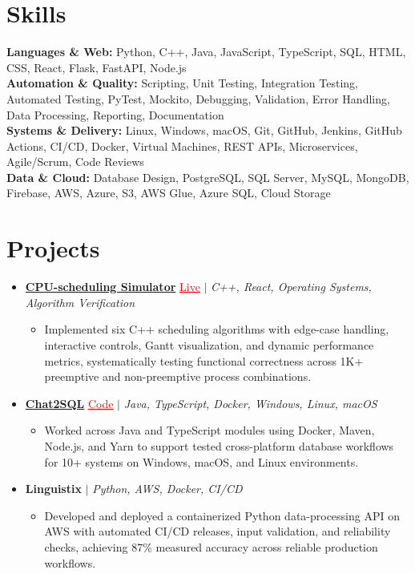 \documentclass[letterpaper,10pt]{article}
\newcommand{\itemTail}{\vspace{-4pt}}
\newcommand{\sectionGap}{\vspace{-8pt}}
\newcommand{\projGap}{\vspace{3pt}}
\newcommand{\resumeItem}[1]{\item\small{{#1 \itemTail}}}
\newcommand{\resumeProjectHeading}[1]{\item \small #1 \vspace{-2pt}}
\newcommand{\resumeProjectLink}[2]{\href{#1}{\textcolor{red}{\underline{#2}}}}
\newcommand{\resumeSubHeadingListStart}{\begin{itemize}[leftmargin=0.0in, label={}]}
\newcommand{\resumeSubHeadingListEnd}{\end{itemize}}
\newcommand{\resumeProjItemListStart}{\begin{itemize}[leftmargin=0.15in,label=\textbullet,itemsep=3pt,topsep=0pt,parsep=0pt,partopsep=0pt]}
\newcommand{\resumeProjItemListEnd}{\end{itemize}\vspace{-4pt}}
\begin{document}
\section{Skills}
\begin{itemize}[leftmargin=0.15in, label={}]
\small{\item{
\textbf{Languages \& Web:} Python, C++, Java, JavaScript, TypeScript, SQL, HTML, CSS, React, Flask, FastAPI, Node.js \\
\textbf{Automation \& Quality:} Scripting, Unit Testing, Integration Testing, Automated Testing, PyTest, Mockito, Debugging, Validation, Error Handling, Data Processing, Reporting, Documentation \\
\textbf{Systems \& Delivery:} Linux, Windows, macOS, Git, GitHub, Jenkins, GitHub Actions, CI/CD, Docker, Virtual Machines, REST APIs, Microservices, Agile/Scrum, Code Reviews \\
\textbf{Data \& Cloud:} Database Design, PostgreSQL, SQL Server, MySQL, MongoDB, Firebase, AWS, Azure, S3, AWS Glue, Azure SQL, Cloud Storage
}}
\end{itemize}
\sectionGap
\section{Projects}
\resumeSubHeadingListStart
\vspace{-2pt}
\resumeProjectHeading{\href{https://cpu-scheduler-amber.vercel.app/}{\textbf{CPU-scheduling Simulator}} \resumeProjectLink{https://cpu-scheduler-amber.vercel.app/}{Live} $|$ \emph{C++, React, Operating Systems, Algorithm Verification}}
\resumeProjItemListStart
\resumeItem{Implemented six C++ scheduling algorithms with edge-case handling, interactive controls, Gantt visualization, and dynamic performance metrics, systematically testing functional correctness across 1K+ preemptive and non-preemptive process combinations.}
\resumeProjItemListEnd
\projGap
\resumeProjectHeading{\href{https://github.com/SAHAJ-BHADJA/Chat2SQL}{\textbf{Chat2SQL}} \resumeProjectLink{https://github.com/SAHAJ-BHADJA/Chat2SQL}{Code} $|$ \emph{Java, TypeScript, Docker, Windows, Linux, macOS}}
\resumeProjItemListStart
\resumeItem{Worked across Java and TypeScript modules using Docker, Maven, Node.js, and Yarn to support tested cross-platform database workflows for 10+ systems on Windows, macOS, and Linux environments.}
\resumeProjItemListEnd
\projGap
\resumeProjectHeading{\textbf{Linguistix} $|$ \emph{Python, AWS, Docker, CI/CD}}
\resumeProjItemListStart
\resumeItem{Developed and deployed a containerized Python data-processing API on AWS with automated CI/CD releases, input validation, and reliability checks, achieving 87\% measured accuracy across reliable production workflows.}
\resumeProjItemListEnd
\resumeSubHeadingListEnd
\end{document}
